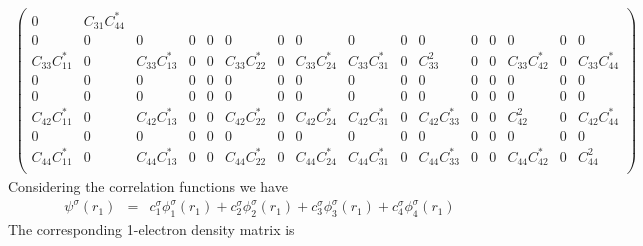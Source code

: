 \documentclass[pra,nofootinbib]{revtex4-1}
\newcommand{\Ctwo}[2]{C_{{#1}{#2}}}
\begin{document}
\begin{eqnarray}
\begin{pmatrix}
    0 &
    \Ctwo{3}{1}\Ctwo{4}{4}^{*} \\
    0 &
    0 &
    0 &
    0 &
    0 &
    0 &
    0 &
    0 &
    0 &
    0 &
    0 &
    0 &
    0 &
    0 &
    0 &
    0 \\
    \Ctwo{3}{3}\Ctwo{1}{1}^{*} &
    0 &
    \Ctwo{3}{3}\Ctwo{1}{3}^{*} &
    0 &
    0 &
    \Ctwo{3}{3}\Ctwo{2}{2}^{*} &
    0 &
    \Ctwo{3}{3}\Ctwo{2}{4}^{*} &
    \Ctwo{3}{3}\Ctwo{3}{1}^{*} &
    0 &
    \Ctwo{3}{3}^2 &
    0 &
    0 &
    \Ctwo{3}{3}\Ctwo{4}{2}^{*} &
    0 &
    \Ctwo{3}{3}\Ctwo{4}{4}^{*} \\
    0 &
    0 &
    0 &
    0 &
    0 &
    0 &
    0 &
    0 &
    0 &
    0 &
    0 &
    0 &
    0 &
    0 &
    0 &
    0 \\
    0 &
    0 &
    0 &
    0 &
    0 &
    0 &
    0 &
    0 &
    0 &
    0 &
    0 &
    0 &
    0 &
    0 &
    0 &
    0 \\
    \Ctwo{4}{2}\Ctwo{1}{1}^{*} &
    0 &
    \Ctwo{4}{2}\Ctwo{1}{3}^{*} &
    0 &
    0 &
    \Ctwo{4}{2}\Ctwo{2}{2}^{*} &
    0 &
    \Ctwo{4}{2}\Ctwo{2}{4}^{*} &
    \Ctwo{4}{2}\Ctwo{3}{1}^{*} &
    0 &
    \Ctwo{4}{2}\Ctwo{3}{3}^{*} &
    0 &
    0 &
    \Ctwo{4}{2}^2 &
    0 &
    \Ctwo{4}{2}\Ctwo{4}{4}^{*} \\
    0 &
    0 &
    0 &
    0 &
    0 &
    0 &
    0 &
    0 &
    0 &
    0 &
    0 &
    0 &
    0 &
    0 &
    0 &
    0 \\
    \Ctwo{4}{4}\Ctwo{1}{1}^{*} &
    0 &
    \Ctwo{4}{4}\Ctwo{1}{3}^{*} &
    0 &
    0 &
    \Ctwo{4}{4}\Ctwo{2}{2}^{*} &
    0 &
    \Ctwo{4}{4}\Ctwo{2}{4}^{*} &
    \Ctwo{4}{4}\Ctwo{3}{1}^{*} &
    0 &
    \Ctwo{4}{4}\Ctwo{3}{3}^{*} &
    0 &
    0 &
    \Ctwo{4}{4}\Ctwo{4}{2}^{*} &
    0 &
    \Ctwo{4}{4}^2 \\
   \end{pmatrix}
\end{eqnarray}
\normalsize
Considering the correlation functions we have
\begin{eqnarray}
   \psi^\sigma(r_1)
        &=& c^\sigma_{1}\phi^\sigma_1(r_1)
         +  c^\sigma_{2}\phi^\sigma_2(r_1)
         +  c^\sigma_{3}\phi^\sigma_3(r_1)
         +  c^\sigma_{4}\phi^\sigma_4(r_1)
\end{eqnarray}
The corresponding 1-electron density matrix is
\end{document}

